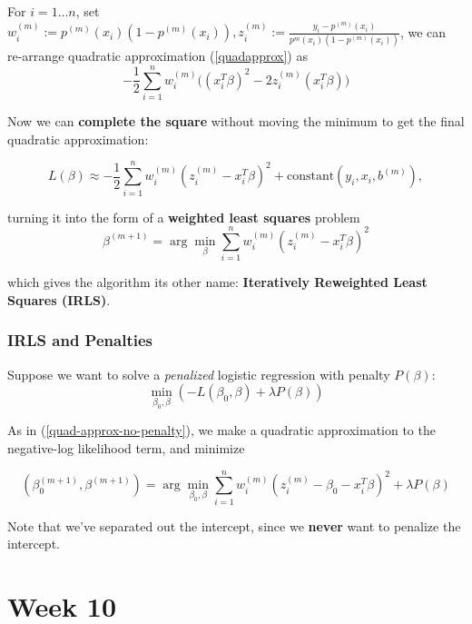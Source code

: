 \documentclass[11pt]{article}
\theoremstyle{definition}
\numberwithin{equation}{section}
\begin{document}
For $i=1\dots n$, set $w_i^{(m)}:=p^{(m)}(x_i)(1-p^{(m)}(x_i)),z_i^{(m)}:=\frac{y_i-p^{(m)} (x_i)}{p^{m}(x_i)(1-p^{(m)}(x_i))}$, we can re-arrange quadratic approximation (\ref{quadapprox}) as
\begin{equation}
  -\frac{1}{2}\sum^n_{i=1}w_i^{(m)}\Bigg( (x_i^T\beta)^2-2z_i^{(m)}(x_i^T\beta) \Bigg)
\end{equation}

Now we can \textbf{complete the square} without moving the minimum to get the final quadratic approximation:

\begin{equation}
  L(\beta)\approx -\frac{1}{2}\sum^n_{i=1}w_i^{(m)}(z_i^{(m)} - x_i^T\beta)^2 + \text{constant}(y_i,x_i,b^{(m)}),
\end{equation}

turning it into the form of a \textbf{weighted least squares} problem
\begin{equation}
  \beta^{(m+1)}=\arg\min_\beta\sum^n_{i=1}w_i^{(m)}(z_i^{(m)}-x_i^T\beta)^2
\end{equation}

which gives the algorithm its other name: \textbf{Iteratively Reweighted Least Squares (IRLS)}.

\subsubsection{IRLS and Penalties}


Suppose we want to solve a \textit{penalized} logistic regression with penalty $P(\beta)$:
\begin{equation}
  \min_{\beta_0,\beta}(-L(\beta_0,\beta) + \lambda P(\beta))
\end{equation}

As in (\ref{quad-approx-no-penalty}), we make a quadratic approximation to the negative-log likelihood term, and minimize

\begin{equation}
  (\beta_0^{(m+1)},\beta^{(m+1)}) = \arg\min_{\beta_0,\beta}\sum^n_{i=1}w_i^{(m)}(z_i^{(m)}-\beta_0-x_i^T\beta)^2 + \lambda P(\beta)
\end{equation}
\begin{writenotes}
  Note that we've separated out the intercept, since we \textbf{never} want to penalize the intercept.
\end{writenotes}

\newpage

\section{Week 10}
\end{document}
